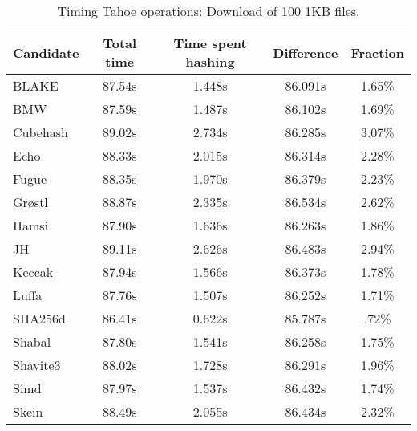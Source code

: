 \begin{table}[h]
  \centering
  \begin{tabular}{ | l | c | c | c | c | }
    \hline
    Candidate & Total time & Time spent hashing & Difference & Fraction \\ \hline
    BLAKE     &  87.54s  &  1.448s  &  86.091s  &  1.65\%  \\  \hline
    BMW       &  87.59s  &  1.487s  &  86.102s  &  1.69\%  \\  \hline
    Cubehash  &  89.02s  &  2.734s  &  86.285s  &  3.07\%  \\  \hline
    Echo      &  88.33s  &  2.015s  &  86.314s  &  2.28\%  \\  \hline
    Fugue     &  88.35s  &  1.970s  &  86.379s  &  2.23\%  \\  \hline
    Grøstl    &  88.87s  &  2.335s  &  86.534s  &  2.62\%  \\  \hline
    Hamsi     &  87.90s  &  1.636s  &  86.263s  &  1.86\%  \\  \hline
    JH        &  89.11s  &  2.626s  &  86.483s  &  2.94\%  \\  \hline
    Keccak    &  87.94s  &  1.566s  &  86.373s  &  1.78\%  \\  \hline
    Luffa     &  87.76s  &  1.507s  &  86.252s  &  1.71\%  \\  \hline
    SHA256d   &  86.41s  &  0.622s  &  85.787s  &  .72\%   \\  \hline
    Shabal    &  87.80s  &  1.541s  &  86.258s  &  1.75\%  \\  \hline
    Shavite3  &  88.02s  &  1.728s  &  86.291s  &  1.96\%  \\  \hline
    Simd      &  87.97s  &  1.537s  &  86.432s  &  1.74\%  \\  \hline
    Skein     &  88.49s  &  2.055s  &  86.434s  &  2.32\%  \\  \hline
  \end{tabular}
  \caption{Timing Tahoe operations: Download of 100 1KB files.}
  \label{tbl:hashingtimes:get1kb}
\end{table}
